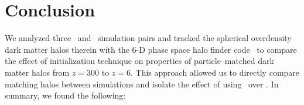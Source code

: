 
%
%

\section{Conclusion}
\label{sec:2lpt--conclusion}



We analyzed three \lpt\ and \za\ simulation pairs and tracked the spherical overdensity dark matter halos therein with the 6-D phase space halo finder code \rockstar\ to compare the effect of initialization technique on properties of particle--matched dark matter halos from $z = 300$ to $z = 6$.  This approach allowed us to directly compare matching halos between simulations and isolate the effect of using \lpt\ over \za.  In summary, we found the following:

